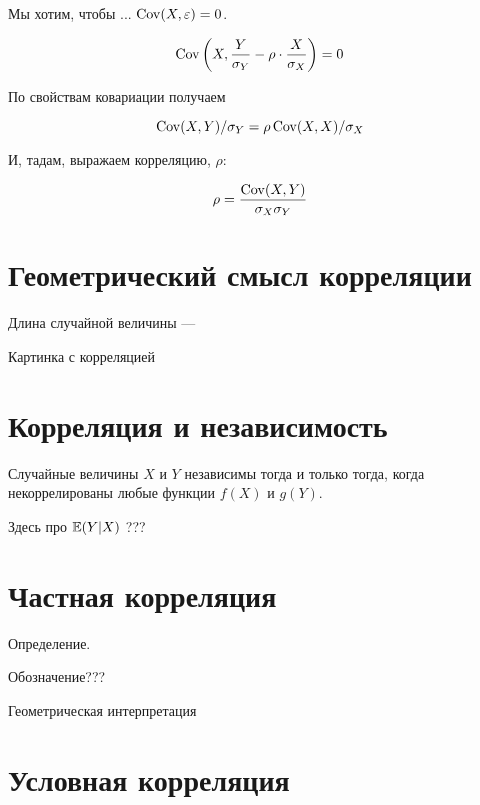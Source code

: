 \documentclass[10pt]{article}
\begin{document}
%

Мы хотим, чтобы ... $\operatorname{Cov}(X,\varepsilon)=0$. 


\[
\operatorname{Cov}\left(X, \frac{Y}{\sigma_Y} - \rho \cdot \frac{X}{\sigma_X} \right) = 0
\]

По свойствам ковариации получаем

\[
\operatorname{Cov}(X,Y)/\sigma_Y=\rho \operatorname{Cov}(X,X)/\sigma_X
\]

И, тадам, выражаем корреляцию, $\rho$:

\[
\rho = \frac{\operatorname{Cov}(X,Y)}{\sigma_X \sigma_Y}
\]

\section{Геометрический смысл корреляции}

Длина случайной величины --- 

Картинка с корреляцией

\section{Корреляция и независимость}

\begin{theorem}
Случайные величины $X$ и $Y$ независимы тогда и только тогда, когда некоррелированы любые функции $f(X)$ и $g(Y)$.
\end{theorem}

Здесь про $\mathbb{E}(Y|X)$ ???

\section{Частная корреляция}

Определение.


Обозначение???

Геометрическая интерпретация

\section{Условная корреляция}
\end{document}
